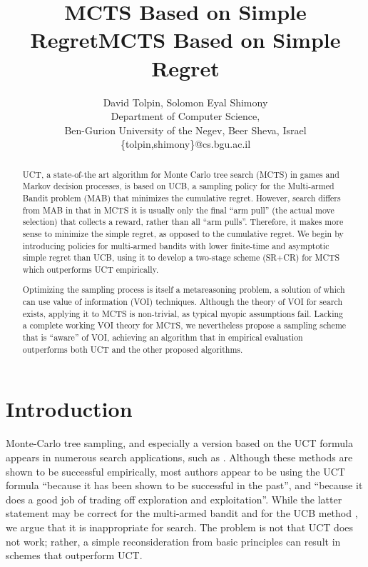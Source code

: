 \documentclass[letterpaper]{article}
\title{MCTS Based on Simple Regret}
\author {David Tolpin, Solomon Eyal Shimony \\
Department of Computer Science, \\
Ben-Gurion University of the Negev, Beer Sheva, Israel \\
\{tolpin,shimony\}@cs.bgu.ac.il}
\title{MCTS Based on Simple Regret}
\begin{document}
\maketitle

\begin{abstract}
UCT, a state-of-the art algorithm for Monte Carlo tree search (MCTS)
in games and Markov decision processes, is based on UCB, a sampling
policy for the Multi-armed Bandit problem (MAB) that 
minimizes the cumulative regret.  However, search differs from MAB in
that in MCTS it is usually only the final ``arm pull'' (the actual
move selection) that collects a reward, rather than all ``arm pulls''.
Therefore, it makes more sense to minimize the simple regret, as
opposed to the cumulative regret. We begin by introducing policies for
multi-armed bandits with lower finite-time and asymptotic simple
regret than UCB, using it to develop a two-stage scheme (SR+CR) for MCTS
which outperforms UCT empirically.

Optimizing the sampling process is itself a
metareasoning problem, a solution of which can use value of
information (VOI) techniques.  Although the theory of VOI for search
exists, applying it to MCTS is non-trivial, as typical myopic
assumptions fail. Lacking a complete working VOI theory for MCTS, we
nevertheless propose a sampling scheme that is ``aware'' of VOI,
achieving an algorithm that in empirical evaluation outperforms 
both UCT and the other proposed algorithms.
\end{abstract}

\section{Introduction}

Monte-Carlo tree sampling, and especially a version based on the
UCT formula \cite{Kocsis.uct} appears in numerous search applications,
such as \cite{Eyerich.ctp}. Although these methods are shown to be successful empirically,
most authors appear to be using the UCT formula ``because it has been shown
to be successful in the past'', and ``because it does a good job of
trading off exploration and exploitation''. While the latter statement may be
correct for the multi-armed bandit and for the UCB method \cite{Auer.ucb},
we argue that it is inappropriate for search. The problem is not that
UCT does not work; rather, a simple reconsideration from basic
principles can result in schemes that outperform UCT.
\end{document}
